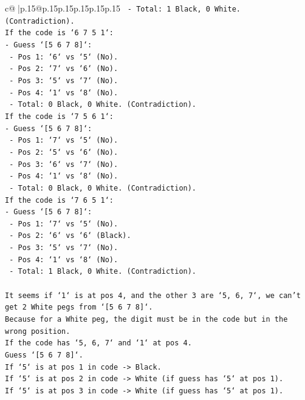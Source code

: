 \documentclass{article}
\begin{document}
{\begin{supertabular}{c@{$\;$}|p{.15\linewidth}@{}p{.15\linewidth}p{.15\linewidth}p{.15\linewidth}p{.15\linewidth}p{.15\linewidth}}
{{{\texttt{  {-} Total: 1 Black, 0 White. (Contradiction).} \\
\texttt{If the code is `6 7 5 1`:} \\
\texttt{{-} Guess `{[}5 6 7 8{]}`:} \\
\texttt{  {-} Pos 1: `6` vs `5` (No).} \\
\texttt{  {-} Pos 2: `7` vs `6` (No).} \\
\texttt{  {-} Pos 3: `5` vs `7` (No).} \\
\texttt{  {-} Pos 4: `1` vs `8` (No).} \\
\texttt{  {-} Total: 0 Black, 0 White. (Contradiction).} \\
\texttt{If the code is `7 5 6 1`:} \\
\texttt{{-} Guess `{[}5 6 7 8{]}`:} \\
\texttt{  {-} Pos 1: `7` vs `5` (No).} \\
\texttt{  {-} Pos 2: `5` vs `6` (No).} \\
\texttt{  {-} Pos 3: `6` vs `7` (No).} \\
\texttt{  {-} Pos 4: `1` vs `8` (No).} \\
\texttt{  {-} Total: 0 Black, 0 White. (Contradiction).} \\
\texttt{If the code is `7 6 5 1`:} \\
\texttt{{-} Guess `{[}5 6 7 8{]}`:} \\
\texttt{  {-} Pos 1: `7` vs `5` (No).} \\
\texttt{  {-} Pos 2: `6` vs `6` (Black).} \\
\texttt{  {-} Pos 3: `5` vs `7` (No).} \\
\texttt{  {-} Pos 4: `1` vs `8` (No).} \\
\texttt{  {-} Total: 1 Black, 0 White. (Contradiction).} \\
\\ 
\texttt{It seems if `1` is at pos 4, and the other 3 are `5, 6, 7`, we can't get 2 White pegs from `{[}5 6 7 8{]}`.} \\
\texttt{Because for a White peg, the digit must be in the code but in the wrong position.} \\
\texttt{If the code has `5, 6, 7` and `1` at pos 4.} \\
\texttt{Guess `{[}5 6 7 8{]}`.} \\
\texttt{If `5` is at pos 1 in code {-}> Black.} \\
\texttt{If `5` is at pos 2 in code {-}> White (if guess has `5` at pos 1).} \\
\texttt{If `5` is at pos 3 in code {-}> White (if guess has `5` at pos 1).} \\
}}}
\end{supertabular}}
\end{document}
